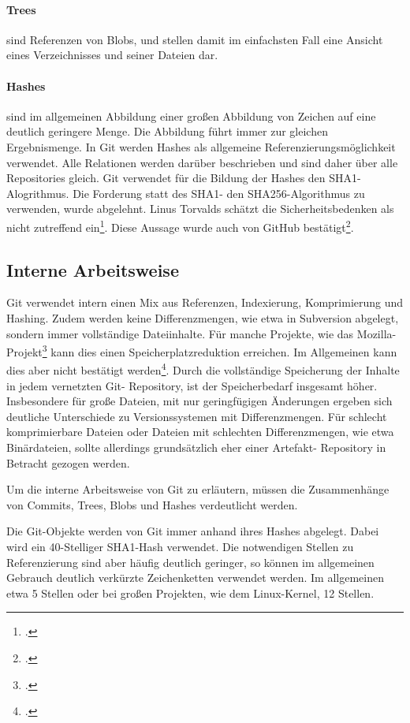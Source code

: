 \paragraph{Trees} sind Referenzen von Blobs, und stellen damit im einfachsten Fall eine Ansicht eines Verzeichnisses und 
seiner Dateien dar.

\paragraph{Hashes} sind im allgemeinen Abbildung einer großen Abbildung von Zeichen auf eine deutlich geringere Menge. 
Die Abbildung führt immer zur gleichen Ergebnismenge. In Git werden Hashes als allgemeine Referenzierungsmöglichkeit 
verwendet. Alle Relationen werden darüber beschrieben und sind daher über alle Repositories gleich. Git verwendet für die 
Bildung der Hashes den SHA1-Alogrithmus. Die Forderung statt des SHA1- den SHA256-Algorithmus zu verwenden, wurde 
abgelehnt. Linus Torvalds schätzt die Sicherheitsbedenken als nicht zutreffend ein\footcite{git-sha-torvalds}. Diese 
Aussage wurde auch von GitHub bestätigt\footcite{git-sha-github}.

\subsection{Interne Arbeitsweise}

Git verwendet intern einen Mix aus Referenzen, Indexierung, Komprimierung und Hashing. Zudem werden keine 
Differenzmengen, wie etwa in Subversion abgelegt, sondern immer vollständige Dateiinhalte. Für manche Projekte, wie das 
Mozilla-Projekt\footcite{kernel-git-svn} kann dies einen Speicherplatzreduktion erreichen. Im Allgemeinen kann dies aber 
nicht bestätigt werden\footcite{svn-vs-git}. Durch die vollständige Speicherung der Inhalte in jedem vernetzten Git-
Repository, ist der Speicherbedarf insgesamt höher. Insbesondere für große Dateien, mit nur geringfügigen Änderungen 
ergeben sich deutliche Unterschiede zu Versionssystemen mit Differenzmengen. Für schlecht komprimierbare Dateien oder 
Dateien mit schlechten Differenzmengen, wie etwa Binärdateien, sollte allerdings grundsätzlich eher einer Artefakt-
Repository in Betracht gezogen werden.

Um die interne Arbeitsweise von Git zu erläutern, müssen die Zusammenhänge von Commits, Trees, Blobs und Hashes 
verdeutlicht werden.

Die Git-Objekte werden von Git immer anhand ihres Hashes abgelegt. Dabei wird ein 40-Stelliger SHA1-Hash verwendet. Die 
notwendigen Stellen zu Referenzierung sind aber häufig deutlich geringer, so können im allgemeinen Gebrauch deutlich 
verkürzte Zeichenketten verwendet werden. Im allgemeinen etwa 5 Stellen oder bei großen Projekten, wie dem Linux-Kernel, 
12 Stellen.

